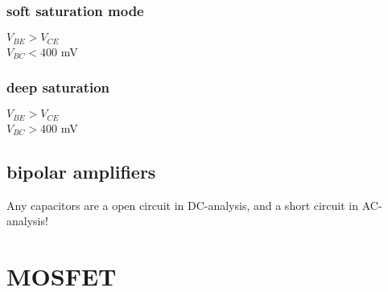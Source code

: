 \documentclass[11ypt]{extarticle}
\begin{document}
\subsubsection{soft saturation mode}

$V_{BE} > V_{CE}$
\\
$V_{BC} < 400$ mV

\subsubsection{deep saturation}

$V_{BE} > V_{CE}$
\\
$V_{BC} > 400$ mV

\subsection{bipolar amplifiers}
Any capacitors are a open circuit in DC-analysis, and a short circuit in AC-analysis!\\



\section{MOSFET}

\begin{figure}[H]{}
    \centering
    
\end{figure}
\end{document}
